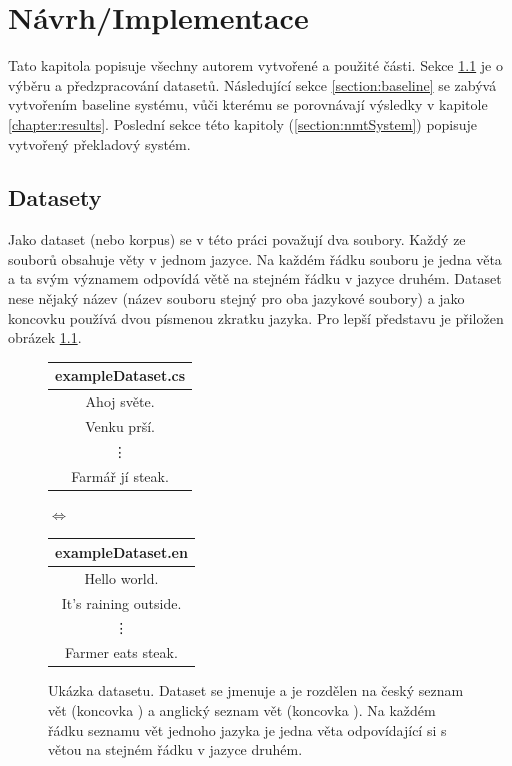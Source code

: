 \chapter{Návrh/Implementace} \label{chapter:implementation}
Tato kapitola popisuje všechny autorem vytvořené a použité části. Sekce \ref{section:datasets} je o výběru a předzpracování datasetů. Následující sekce \ref{section:baseline} se zabývá vytvořením baseline systému, vůči kterému se porovnávají výsledky v kapitole \ref{chapter:results}. Poslední sekce této kapitoly (\ref{section:nmtSystem}) popisuje vytvořený překladový systém.

\section{Datasety}\label{section:datasets}
Jako dataset (nebo korpus) se v této práci považují dva soubory. Každý ze souborů obsahuje věty v jednom jazyce. Na každém řádku souboru je jedna věta a ta svým významem odpovídá větě na stejném řádku v jazyce druhém. Dataset nese nějaký název (název souboru stejný pro oba jazykové soubory) a jako koncovku používá dvou písmenou zkratku jazyka. Pro lepší představu je přiložen obrázek \ref{img:dataset}.

\begin{figure}[h]
    \begin{center}
        \begin{tabular}{|c|}
          \hline
          exampleDataset.cs\\
          \hline
          Ahoj světe. \\
          Venku prší. \\
          \vdots \\
          Farmář jí steak. \\
          \hline
        \end{tabular}
        $\Longleftrightarrow$
        \begin{tabular}{|c|}
          \hline
          exampleDataset.en\\
          \hline
          Hello world. \\
          It's raining outside. \\
          \vdots \\
          Farmer eats steak. \\
          \hline
        \end{tabular}
    \end{center}
	\caption{Ukázka datasetu. Dataset se jmenuje  a je rozdělen na český seznam vět (koncovka ) a anglický seznam vět (koncovka ). Na každém řádku seznamu vět jednoho jazyka je jedna věta odpovídající si s větou na stejném řádku v jazyce druhém.}
	\label{img:dataset}
\end{figure}

